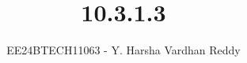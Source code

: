 \documentclass[journal]{IEEEtran}
\begin{document}
	
	
	\vspace{3cm}
	
	\title{10.3.1.3}
	\author{EE24BTECH11063 - Y. Harsha Vardhan Reddy }
	{\let\newpage\relax\maketitle}
	
	\renewcommand{\thefigure}{\theenumi}
	\renewcommand{\thetable}{\theenumi}
	\setlength{\intextsep}{10pt} %
	
	
	\renewcommand{\thetable}{\theenumi}
	
\end{document}
